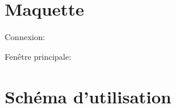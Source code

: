 \documentclass[oneside]{report}
\begin{document}
	\section{Maquette}
	{
		\par Connexion:\\
		\noindent{}
		\par Fenêtre principale:\\
		\noindent{}
	}

	\section{Schéma d'utilisation}
	{
		\noindent{}
	}
	\newpage
\end{document}
